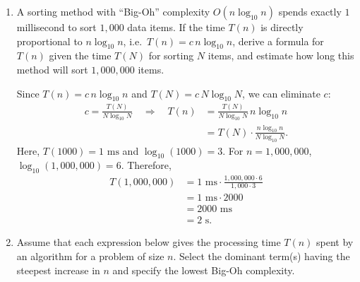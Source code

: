 \documentclass[12pt]{scrartcl}
\begin{document}
\begin{enumerate}[label=\textbf{\arabic*.}]
	      \begin{lstlisting}
if __name__ == "__main__":
    list1 = build_list([3, 6, 6, 10, 45, 45, 50])
    list2 = build_list([2, 3, 55, 60])

    merged = merge_sorted_lists(list1, list2)
    print_list(merged)  
    # 2 -> 3 -> 3 -> 6 -> 6 -> 10 -> 45 -> 45 -> 50 -> 55 -> 60

\end{lstlisting}

	\item
	      A sorting method with ``Big-Oh'' complexity \(O(n\log_{10}n)\) spends exactly \(1\) millisecond
	      to sort \(1{,}000\) data items. If the time \(T(n)\) is directly proportional to \(n\log_{10}n\),
	      i.e.\ \(T(n)=c\,n\log_{10}n\), derive a formula for \(T(n)\) given the time \(T(N)\) for sorting \(N\) items,
	      and estimate how long this method will sort \(1{,}000{,}000\) items.

	      \vspace{0.3cm}
	      Since \(T(n)=c\,n\log_{10}n\) and \(T(N)=c\,N\log_{10}N\), we can eliminate \(c\):
	      \begin{align*}
		      c=\frac{T(N)}{N\log_{10}N}
		      \quad\Rightarrow\quad
		      T(n) & =\frac{T(N)}{N\log_{10}N}\,n\log_{10}n     \\
		           & =T(N)\cdot\frac{n\log_{10}n}{N\log_{10}N}.
	      \end{align*}
	      Here, \(T(1000)=1\text{ ms}\) and \(\log_{10}(1000)=3\). For \(n=1{,}000{,}000\), \(\log_{10}(1{,}000{,}000)=6\).
	      Therefore,
	      \begin{align*}
		      T(1{,}000{,}000) & =1\text{ ms}\cdot
		      \frac{1{,}000{,}000\cdot 6}{1{,}000\cdot 3} \\
		                       & =1\text{ ms}\cdot 2000   \\
		                       & =2000\text{ ms}          \\
		                       & =2\text{ s}.
	      \end{align*}

	\item
	      Assume that each expression below gives the processing time \(T(n)\) spent by an algorithm for a problem of size \(n\).
	      Select the dominant term(s) having the steepest increase in \(n\) and specify the lowest Big-Oh complexity.


\end{enumerate}
\end{document}
